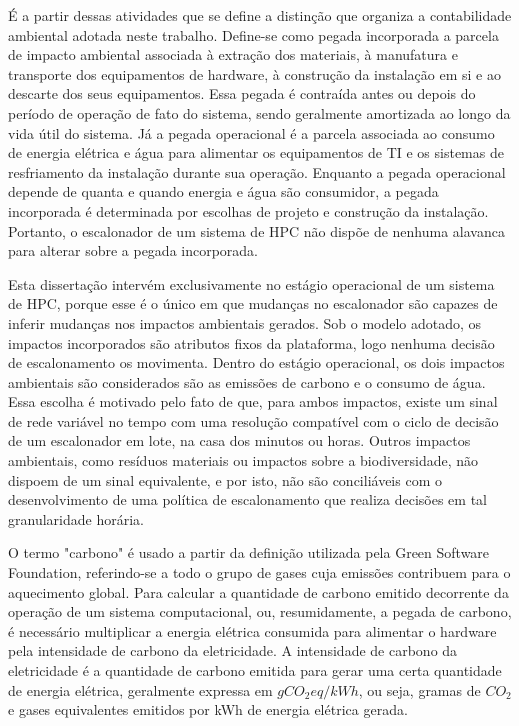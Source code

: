 É a partir dessas atividades que se define a distinção que organiza a contabilidade ambiental adotada
neste trabalho. Define-se como pegada incorporada a parcela de impacto ambiental associada à 
extração dos materiais, à manufatura e transporte dos equipamentos de hardware, à construção da
instalação em si e ao descarte dos seus equipamentos. Essa pegada é contraída antes ou depois do
período de operação de fato do sistema, sendo geralmente amortizada ao longo da vida útil do sistema.
Já a pegada operacional é a parcela associada ao consumo de energia elétrica e água para alimentar os
equipamentos de TI e os sistemas de resfriamento da instalação durante sua operação. Enquanto a pegada
operacional depende de quanta e quando energia e água são consumidor, a pegada incorporada é determinada
por escolhas de projeto e construção da instalação. Portanto, o escalonador de um sistema de HPC 
não dispõe de nenhuma alavanca para alterar sobre a pegada incorporada.

Esta dissertação intervém exclusivamente no estágio operacional de um sistema de HPC, porque esse é o único
em que mudanças no escalonador são capazes de inferir mudanças nos impactos ambientais gerados. Sob o modelo adotado,
os impactos incorporados são atributos fixos da plataforma, logo nenhuma decisão de escalonamento os movimenta.
Dentro do estágio operacional, os dois impactos ambientais são considerados são as emissões de carbono e 
o consumo de água. Essa escolha é motivado pelo fato de que, para ambos impactos, existe um sinal de rede variável
no tempo com uma resolução compatível com o ciclo de decisão de um escalonador em lote, na casa dos minutos ou horas. 
Outros impactos ambientais, como resíduos materiais ou impactos sobre a biodiversidade, não dispoem de um sinal equivalente,
e por isto, não são conciliáveis com o desenvolvimento de uma política de escalonamento que realiza decisões
em tal granularidade horária.

O termo "carbono" é usado a partir da definição utilizada pela Green Software Foundation, referindo-se 
a todo o grupo de gases cuja emissões contribuem para o aquecimento global. Para
calcular a quantidade de carbono emitido decorrente da operação de um sistema computacional, ou, resumidamente, 
a pegada de carbono, é necessário multiplicar a energia elétrica consumida para alimentar o hardware 
pela intensidade de carbono da eletricidade. A intensidade de carbono da eletricidade é a quantidade de carbono emitida para gerar uma certa 
quantidade de energia elétrica, geralmente expressa em $gCO_{2}eq/kWh$, ou seja, gramas de $CO_{2}$ e gases equivalentes
emitidos por kWh de energia elétrica gerada.

